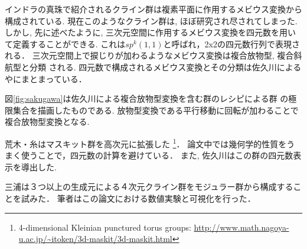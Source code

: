 インドラの真珠で紹介されるクライン群は複素平面に作用するメビウス変換から構成されている.
現在このようなクライン群は, ほぼ研究され尽されてしまった.
しかし, 先に述べたように, 三次元空間に作用するメビウス変換を四元数を用い
て定義することができる.
これは$sp^k(1, 1)$と呼ばれ，2x2の四元数行列で表現される．
三次元空間上で捩じりが加わるようなメビウス変換は複合放物型, 複合斜航型と分類
される.
四元数で構成されるメビウス変換とその分類は佐久川による
\cite{sakugawaMaster}や\cite{accidentalParabolic}にまとまっている．

図\ref{fig:sakugawa}は佐久川による複合放物型変換を含む群のレシピによる群
の極限集合を描画したものである.
放物型変換である平行移動に回転が加わることで複合放物型変換となる.

荒木・糸はマスキット群を高次元に拡張した\cite{maskit}
\footnote{4-dimensional Kleinian punctured torus groups:
\url{http://www.math.nagoya-u.ac.jp/~itoken/3d-maskit/3d-maskit.html}}．
論文中では幾何学的性質をうまく使うことで，四元数の計算を避けている．
また, 佐久川はこの群の四元数表示を導出した\cite{sakugawa4d}.

三浦は３つ以上の生成元による４次元クライン群をモジュラー群から構成するこ
とを試みた\cite{miura}．
筆者はこの論文における数値実験と可視化を行った．

